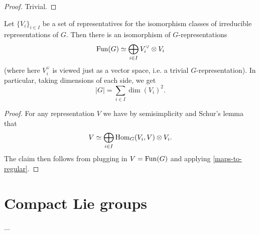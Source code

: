 \begin{proof}
  Trivial.
\end{proof}

\begin{corollary}
  \label{regular-decomposition}
  Let $\{V_i\}_{i \in I}$ be a set of representatives for the isomorphism classes of irreducible representations of $G$. Then there is an isomorphism of $G$-representations
  \[
    \operatorname{Fun}(G) \simeq \bigoplus_{i \in I} V_i^\vee \otimes V_i
  \]
  (where here $V_i^\vee$ is viewed just as a vector space, i.e. a trivial $G$-representation). In particular, taking dimensions of each side, we get
  \[
    |G| = \sum_{i \in I} \dim(V_i)^2.
  \]
\end{corollary}

\begin{proof}
  For any representation $V$ we have by semisimplicity and Schur's lemma that
  \[
    V \simeq \bigoplus_{i \in I} \operatorname{Hom}_G(V_i, V) \otimes V_i.
  \]
  The claim then follows from plugging in $V = \operatorname{Fun}(G)$ and applying \cref{maps-to-regular}.
\end{proof}


\section{Compact Lie groups}

...


% 
% 


